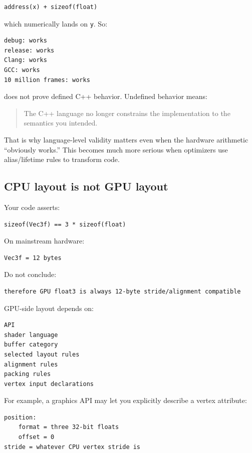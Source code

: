 \begin{verbatim}
address(x) + sizeof(float)
\end{verbatim}

which numerically lands on \texttt{y}. So:

\begin{verbatim}
debug: works
release: works
Clang: works
GCC: works
10 million frames: works
\end{verbatim}

does not prove defined C++ behavior. Undefined behavior means:

\begin{quote}
The C++ language no longer constrains the implementation to the semantics you intended.
\end{quote}

That is why language-level validity matters even when the hardware arithmetic ``obviously works.'' This becomes much more serious when optimizers use alias/lifetime rules to transform code.

\subsection{CPU layout is not GPU layout}\label{05-engine-i-ch003-cpu-layout-is-not-gpu-layout}

Your code asserts:

\begin{verbatim}
sizeof(Vec3f) == 3 * sizeof(float)
\end{verbatim}

On mainstream hardware:

\begin{verbatim}
Vec3f = 12 bytes
\end{verbatim}

Do not conclude:

\begin{verbatim}
therefore GPU float3 is always 12-byte stride/alignment compatible
\end{verbatim}

GPU-side layout depends on:

\begin{verbatim}
API
shader language
buffer category
selected layout rules
alignment rules
packing rules
vertex input declarations
\end{verbatim}

For example, a graphics API may let you explicitly describe a vertex attribute:

\begin{verbatim}
position:
    format = three 32-bit floats
    offset = 0
stride = whatever CPU vertex stride is
\end{verbatim}

